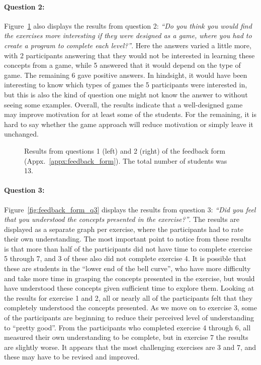 \paragraph{Question 2:} Figure~\ref{fig:feedback_form_q12} also displays the results from question 2: \emph{``Do you think you would find the exercises more interesting if they were designed as a game, where you had to create a program to complete each level?''}. Here the answers varied a little more, with 2 participants answering that they would not be interested in learning these concepts from a game, while 5 answered that it would depend on the type of game. The remaining 6 gave positive answers. In hindsight, it would have been interesting to know which types of games the 5 participants were interested in, but this is also the kind of question one might not know the answer to without seeing some examples. Overall, the results indicate that a well-designed game may improve motivation for at least some of the students. For the remaining, it is hard to say whether the game approach will reduce motivation or simply leave it unchanged.

\begin{figure}[htp]
	\caption[Results from feedback form questions 1 and 2]{Results from questions 1 (left) and 2 (right) of the feedback form (Appx.~\ref{appx:feedback_form}). The total number of students was 13.}
	\label{fig:feedback_form_q12}
\end{figure}

\paragraph{Question 3:} Figure~\ref{fig:feedback_form_q3} displays the results from question 3: \emph{``Did you feel that you understood the concepts presented in the exercise?''}. The results are displayed as a separate graph per exercise, where the participants had to rate their own understanding. The most important point to notice from these results is that more than half of the participants did not have time to complete exercise 5 through 7, and 3 of these also did not complete exercise 4. It is possible that these are students in the ``lower end of the bell curve'', who have more difficulty and take more time in grasping the concepts presented in the exercise, but would have understood these concepts given sufficient time to explore them. Looking at the results for exercise 1 and 2, all or nearly all of the participants felt that they completely understood the concepts presented. As we move on to exercise 3, some of the participants are beginning to reduce their perceived level of understanding to ``pretty good''. From the participants who completed exercise 4 through 6, all measured their own understanding to be complete, but in exercise 7 the results are slightly worse. It appears that the most challenging exercises are 3 and 7, and these may have to be revised and improved.

